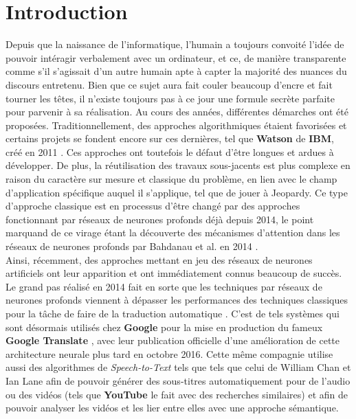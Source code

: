 \section{Introduction}

Depuis que la naissance de l'informatique, l'humain a toujours convoité l'idée de pouvoir intéragir verbalement avec un ordinateur, et ce, de manière transparente comme s'il s'agissait d'un autre humain apte à capter la majorité des nuances du discours entretenu. Bien que ce sujet aura fait couler beaucoup d'encre et fait tourner les têtes, il n'existe toujours pas à ce jour une formule secrète parfaite pour parvenir à sa réalisation. Au cours des années, différentes démarches ont été proposées. Traditionnellement, des approches algorithmiques étaient favorisées et certains projets se fondent encore sur ces dernières, tel que \textbf{Watson} de \textbf{IBM}, créé en 2011 \cite{ibmWatson}. Ces approches ont toutefois le défaut d'être longues et ardues à développer. De plus, la réutilisation des travaux sous-jacents est plus complexe en raison du caractère sur mesure et classique du problème, en lien avec le champ d'application spécifique auquel il s'applique, tel que de jouer à Jeopardy. Ce type d'approche classique est en processus d'être changé par des approches fonctionnant par réseaux de neurones profonds déjà depuis 2014, le point marquand de ce virage étant la découverte des mécanismes d'attention dans les réseaux de neurones profonds par Bahdanau et al. en 2014 \cite{attentionMechanism}.  \\

Ainsi, récemment, des approches mettant en jeu des réseaux de neurones artificiels ont leur apparition et ont immédiatement connus beaucoup de succès. Le grand pas réalisé en 2014 fait en sorte que les techniques par réseaux de neurones profonds viennent à dépasser les performances des techniques classiques pour la tâche de faire de la traduction automatique \cite{attentionMechanism}. C’est de tels systèmes qui sont désormais utilisés chez \textbf{Google} pour la mise en production du fameux \textbf{Google Translate} \cite{googleTranslate}, avec leur publication officielle d'une amélioration de cette architecture neurale plus tard en octobre 2016. Cette même compagnie utilise aussi des algorithmes de \textit{Speech-to-Text} tels que tels que celui de William Chan et Ian Lane \cite{acousticModeling} afin de pouvoir générer des sous-titres automatiquement pour de l'audio ou des vidéos (tels que \textbf{YouTube} le fait avec des recherches similaires) et afin de pouvoir analyser les vidéos et les lier entre elles avec une approche sémantique. \\

